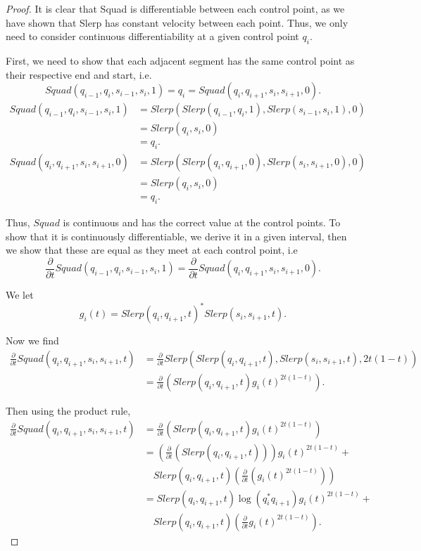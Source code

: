 \documentclass[a4paper, 11pt]{article}
\begin{document}
\begin{proof}

    It is clear that Squad is differentiable between each control point, as we have shown that Slerp has constant velocity between each point. Thus, we only need to consider continuous differentiability at a given control point $q_i$.

    First, we need to show that each adjacent segment has the same control point as their respective end and start, i.e. 
    \[Squad(q_{i-1},q_i,s_{i-1},s_i,1) = q_i = Squad(q_i,q_{i+1},s_i,s_{i+1},0).\]
    \begin{align*}
        Squad(q_{i-1},q_i,s_{i-1},s_i,1) &= Slerp(Slerp(q_{i-1},q_i,1),Slerp(s_{i-1},s_i,1),0) \\ &= Slerp(q_i,s_i,0) \\&= q_i.
    \end{align*}
    \begin{align*}
        Squad(q_i,q_{i+1},s_i,s_{i+1},0) &= Slerp(Slerp(q_i,q_{i+1},0),Slerp(s_i,s_{i+1} ,0),0) \\& = Slerp(q_i,s_i,0) \\&= q_i.
    \end{align*}

    Thus, $Squad$ is continuous and has the correct value at the control points. To show that it is continuously differentiable, we derive it in a given interval, then we show that these are equal as they meet at each control point, i.e 
    \[\frac{\partial}{\partial t}Squad(q_{i-1},q_i,s_{i-1},s_i,1) = \frac{\partial}{\partial t}Squad(q_i,q_{i+1},s_i,s_{i+1},0).\]

    We let
    \[g_i(t) = Slerp(q_i,q_{i+1},t)^*Slerp(s_i,s_{i+1} ,t).\]

    Now we find
    \begin{align*}
    \frac{\partial}{\partial t} Squad(q_i, q_{i+1}, s_i, s_{i+1}, t) &= \frac{\partial}{\partial t} Slerp(Slerp(q_i, q_{i+1}, t), Slerp(s_i, s_{i+1}, t), 2t(1-t)) \\
    &= \frac{\partial}{\partial t} \left(Slerp(q_i, q_{i+1}, t) g_i(t)^{2t(1-t)} \right).
    \end{align*}

    Then using the product rule,
    \begin{align*}
    \frac{\partial}{\partial t} Squad(q_i, q_{i+1}, s_i, s_{i+1}, t) &= \frac{\partial}{\partial t} \left( Slerp(q_i, q_{i+1}, t) g_i(t)^{2t(1-t)} \right) \\
    &= \left( \frac{\partial}{\partial t} (Slerp(q_i, q_{i+1}, t)) \right) g_i(t)^{2t(1-t)} + \\
    &\quad Slerp(q_i, q_{i+1}, t) \left( \frac{\partial}{\partial t} (g_i(t)^{2t(1-t)}) \right) \\
    &= Slerp(q_i, q_{i+1}, t) \log(q_i^* q_{i+1}) g_i(t)^{2t(1-t)} + \\
    &\quad Slerp(q_i, q_{i+1}, t) \left( \frac{\partial}{\partial t} g_i(t)^{2t(1-t)} \right).
    \end{align*}


\end{proof}
\end{document}
